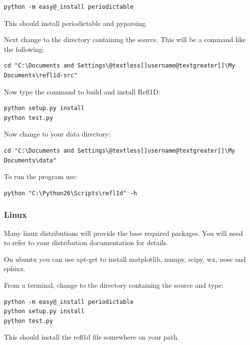 \documentclass[letterpaper,10pt,english]{sphinxmanual}
\begin{document}
\begin{Verbatim}[commandchars=@\[\]]
python -m easy@_install periodictable
\end{Verbatim}

This should install periodictable and pyparsing.

Next change to the directory containing the source.  This will be a command
like the following:

\begin{Verbatim}[commandchars=@\[\]]
cd "C:\Documents and Settings\@textless[]username@textgreater[]\My Documents\refl1d-src"
\end{Verbatim}

Now type the command to build and install Refl1D:

\begin{Verbatim}[commandchars=@\[\]]
python setup.py install
python test.py
\end{Verbatim}

Now change to your data directory:

\begin{Verbatim}[commandchars=@\[\]]
cd "C:\Documents and Settings\@textless[]username@textgreater[]\My Documents\data"
\end{Verbatim}

To run the program use:

\begin{Verbatim}[commandchars=@\[\]]
python "C:\Python26\Scripts\refl1d" -h
\end{Verbatim}


\subsubsection{Linux}
\label{getting_started/install:linux}
Many linux distributions will provide the base required packages.  You
will need to refer to your distribution documentation for details.

On ubuntu you can use apt-get to install matplotlib, numpy, scipy, wx,
nose and sphinx.

From a terminal, change to the directory containing the source and type:

\begin{Verbatim}[commandchars=@\[\]]
python -m easy@_install periodictable
python setup.py install
python test.py
\end{Verbatim}

This should install the refl1d file somewhere on your path.
\end{document}
